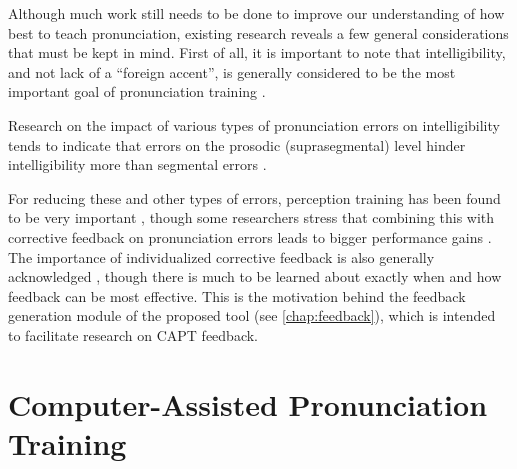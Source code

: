 Although much work still needs to be done to improve our understanding of how best to teach pronunciation, existing research reveals a few general considerations that must be kept in mind.
	First of all, it is important to note that 
intelligibility, and not lack of a ``foreign accent'', is generally considered to be the most important goal of pronunciation training \citep{Neri2002,Derwing2005,Witt2012}. 
	

Research on the impact of various types of pronunciation errors on intelligibility tends to indicate that errors on the prosodic (suprasegmental) level hinder intelligibility more than segmental errors \citep{Anderson-Hsieh1992,Hahn2004,Derwing2005,Hirschfeld2007,Dlaska2013}. 

For reducing these and other types of errors,
perception training 
has been found to be very important \citep{Derwing2005,Hirschfeld2007},
though some researchers stress that combining this with corrective feedback on pronunciation errors leads to bigger performance gains \citep{Dlaska2013}. 
%
The importance of individualized corrective feedback is also generally acknowledged \citep{Neri2002,Mehlhorn2005,Dlaska2013}, 
though there is much to be learned about exactly when and how feedback can be most effective. This is the motivation behind the feedback generation module of the proposed tool (see \cref{chap:feedback}), which is intended to facilitate research on CAPT feedback.






\section{Computer-Assisted Pronunciation Training}
\label{sec:bkgd:capt}



